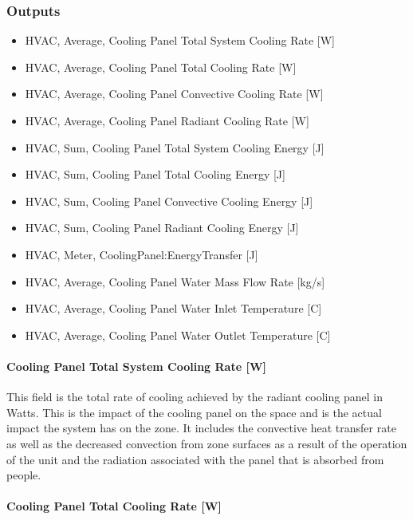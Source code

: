 \subsubsection{Outputs}\label{outputs-radiant-convective-cooling-panel}

\begin{itemize}
\item
  HVAC, Average, Cooling Panel Total System Cooling Rate [W]
\item
  HVAC, Average, Cooling Panel Total Cooling Rate [W]
\item
  HVAC, Average, Cooling Panel Convective Cooling Rate [W]
\item
  HVAC, Average, Cooling Panel Radiant Cooling Rate [W]
\item
  HVAC, Sum, Cooling Panel Total System Cooling Energy [J]
\item
  HVAC, Sum, Cooling Panel Total Cooling Energy [J]
\item
  HVAC, Sum, Cooling Panel Convective Cooling Energy [J]
\item
  HVAC, Sum, Cooling Panel Radiant Cooling Energy [J]
\item
  HVAC, Meter, CoolingPanel:EnergyTransfer [J]
\item
  HVAC, Average, Cooling Panel Water Mass Flow Rate [kg/s]
\item
  HVAC, Average, Cooling Panel Water Inlet Temperature [C]
\item
  HVAC, Average, Cooling Panel Water Outlet Temperature [C]
\end{itemize}

\paragraph{Cooling Panel Total System Cooling Rate [W]}\label{cooling-panel-total-system-cooling-rate-w}

This field is the total rate of cooling achieved by the radiant cooling panel in Watts. This is the impact of the cooling panel on the space and is the actual impact the system has on the zone.  It includes the convective heat transfer rate as well as the decreased convection from zone surfaces as a result of the operation of the unit and the radiation associated with the panel that is absorbed from people.

\paragraph{Cooling Panel Total Cooling Rate [W]}\label{cooling-panel-total-cooling-rate-w}

